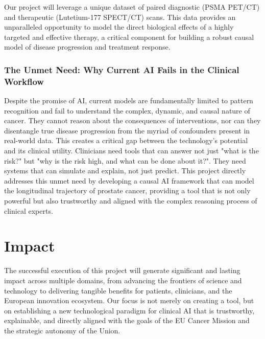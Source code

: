 \documentclass[11pt, a4paper]{article}
\begin{document}
Our project will leverage a unique dataset of paired diagnostic (PSMA PET/CT) and therapeutic (Lutetium-177 SPECT/CT) scans. This data provides an unparalleled opportunity to model the direct biological effects of a highly targeted and effective therapy, a critical component for building a robust causal model of disease progression and treatment response.

\subsubsection{The Unmet Need: Why Current AI Fails in the Clinical Workflow}
Despite the promise of AI, current models are fundamentally limited to pattern recognition and fail to understand the complex, dynamic, and causal nature of cancer. They cannot reason about the consequences of interventions, nor can they disentangle true disease progression from the myriad of confounders present in real-world data. This creates a critical gap between the technology's potential and its clinical utility. Clinicians need tools that can answer not just "what is the risk?" but "why is the risk high, and what can be done about it?". They need systems that can simulate and explain, not just predict. This project directly addresses this unmet need by developing a causal AI framework that can model the longitudinal trajectory of prostate cancer, providing a tool that is not only powerful but also trustworthy and aligned with the complex reasoning process of clinical experts.

\section{Impact}
The successful execution of this project will generate significant and lasting impact across multiple domains, from advancing the frontiers of science and technology to delivering tangible benefits for patients, clinicians, and the European innovation ecosystem. Our focus is not merely on creating a tool, but on establishing a new technological paradigm for clinical AI that is trustworthy, explainable, and directly aligned with the goals of the EU Cancer Mission and the strategic autonomy of the Union.
\end{document}
